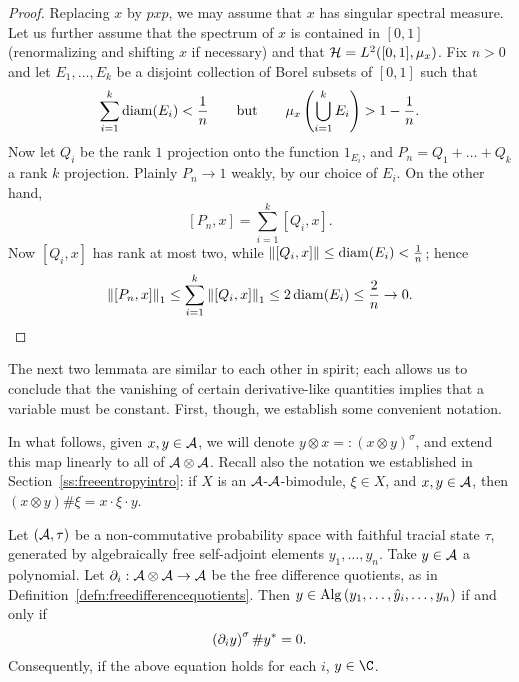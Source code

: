 \begin{proof}
	Replacing $x$ by $pxp$, we may assume that $x$ has singular spectral measure.
	Let us further assume that the spectrum of $x$ is contained in $[0,1]$ (renormalizing and shifting $x$ if necessary) and that $\mathcal{H} = L^2([0,1], \mu_x)$.
	Fix $n > 0$ and let $E_1, \ldots, E_k$ be a disjoint collection of Borel subsets of $[0,1]$ such that
	$$\sum_{i=1}^k\operatorname{diam}(E_i) < \frac1n \qquad\text{but}\qquad \mu_x\left(\bigcup_{i=1}^k E_i\right) > 1-\frac1n.$$
	Now let $Q_i$ be the rank $1$ projection onto the function $1_{E_i}$, and $P_n = Q_1 + \ldots + Q_k$ a rank $k$ projection.
	Plainly $P_n \to 1$ weakly, by our choice of $E_i$.
	On the other hand, 
	$$[P_n, x] = \sum_{i=1}^k [Q_i, x].$$
	Now $[Q_i, x]$ has rank at most two, while $\left\|[Q_i, x]\right\| \leq \operatorname{diam}(E_i) < \frac1n$; hence 
	$$\left\|[P_n, x]\right\|_1 \leq \sum_{i=1}^k \left\|[Q_i, x]\right\|_1 \leq 2\operatorname{diam}(E_i) \leq \frac2n \to 0.$$
\end{proof}

The next two lemmata are similar to each other in spirit; each allows us to conclude that the vanishing of certain derivative-like quantities implies that a variable must be constant.
First, though, we establish some convenient notation.
\begin{notation}
	In what follows, given $x, y \in \mathcal{A}$, we will denote $y\otimes x =: (x\otimes y)^\sigma$, and extend this map linearly to all of $\mathcal{A}\otimes\mathcal{A}$.
	Recall also the notation we established in Section~\ref{ss:freeentropyintro}: if $X$ is an $\mathcal{A}$-$\mathcal{A}$-bimodule, $\xi\in X$, and $x, y \in \mathcal{A}$, then $(x\otimes y)\#\xi = x\cdot\xi\cdot y$.
\end{notation}

\begin{lemma}
	\label{lem:zero-der}
	Let $(\mathcal{A}, \tau)$ be a non-commutative probability space with faithful tracial state $\tau$, generated by algebraically free self-adjoint elements $y_1, \ldots, y_n$.
	Take $y \in \mathcal{A}$ a polynomial.
	Let $\partial_i : \mathcal{A}\otimes\mathcal{A} \to \mathcal{A}$ be the free difference quotients, as in Definition~\ref{defn:freedifferencequotients}.
	Then $y \in \operatorname{Alg}\left(y_1, \ldots, \hat{y}_i, \ldots, y_n\right)$ if and only if
	$$\left(\partial_i y\right)^\sigma\#y^* = 0.$$
	Consequently, if the above equation holds for each $i$, $y \in \C$.
\end{lemma}

